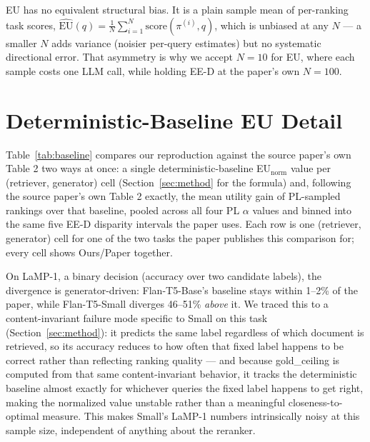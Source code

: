 \documentclass[10pt,twocolumn]{article}
\begin{document}
EU has no equivalent structural bias. It is a plain sample mean of per-ranking
task scores, $\widehat{\text{EU}}(q) = \frac{1}{N}\sum_{i=1}^N
\text{score}(\pi^{(i)}, q)$, which is unbiased at any $N$ --- a smaller $N$ adds
variance (noisier per-query estimates) but no systematic directional error. That
asymmetry is why we accept $N{=}10$ for EU, where each sample costs one LLM call,
while holding EE-D at the paper's own $N{=}100$.

\section{Deterministic-Baseline EU Detail}
\label{app:baseline}

Table~\ref{tab:baseline} compares our reproduction against the source paper's own
Table 2 two ways at once: a single deterministic-baseline EU$_{\text{norm}}$ value
per (retriever, generator) cell (Section~\ref{sec:method} for the formula) and,
following the source paper's own Table 2 exactly, the mean utility gain of
PL-sampled rankings over that baseline, pooled across all four PL $\alpha$ values
and binned into the same five EE-D disparity intervals the paper uses. Each row is
one (retriever, generator) cell for one of the two tasks the paper publishes this
comparison for; every cell shows Ours/Paper together.

On LaMP-1, a binary decision (accuracy over two candidate labels), the divergence is
generator-driven: Flan-T5-Base's baseline stays within 1--2\% of the paper, while
Flan-T5-Small diverges 46--51\% \emph{above} it. We traced this to a
content-invariant failure mode specific to Small on this task (Section~\ref{sec:method}):
it predicts the same label regardless of which document is retrieved, so its accuracy
reduces to how often that fixed label happens to be correct rather than reflecting
ranking quality --- and because gold\_ceiling is computed from that same
content-invariant behavior, it tracks the deterministic baseline almost exactly for
whichever queries the fixed label happens to get right, making the normalized value
unstable rather than a meaningful closeness-to-optimal measure. This makes Small's
LaMP-1 numbers intrinsically noisy at this sample size, independent of anything about
the reranker.
\end{document}
